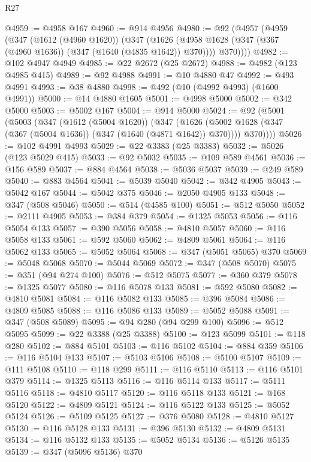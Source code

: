 \begin{lexlean}{R27}
\begin{coremodule}
@4959 := @4958 @167
@4960 := @914 @4956
@4980 := @92
    (@4957
      (@4959
        (@347
          (@1612 (@4960 @1620))
          (@347
            (@1626 (@4958 @1628 (@347 (@367 (@4960 @1636)) (@347 (@1640 (@4835 @1642)) @370))))
            @370))))
@4982 := @102 @4947 @4949
@4985 := @22 @2672 (@25 @2672)
@4988 := @4982 (@123 @4985 @415)
@4989 := @92 @4988
@4991 := @10 @4880 @47
@4992 := @493 @4991
@4993 := @38 @4880
@4998 := @492 (@10 (@4992 @4993) (@1600 @4991))
@5000 := @14 @4880 @1605
@5001 := @4998 @5000
@5002 := @342 @5000
@5003 := @5002 @167
@5004 := @914 @5000
@5024 := @92
    (@5001
      (@5003
        (@347
          (@1612 (@5004 @1620))
          (@347
            (@1626 (@5002 @1628 (@347 (@367 (@5004 @1636)) (@347 (@1640 (@4871 @1642)) @370))))
            @370))))
@5026 := @102 @4991 @4993
@5029 := @22 @3383 (@25 @3383)
@5032 := @5026 (@123 @5029 @415)
@5033 := @92 @5032
@5035 := @109 @589 @4561
@5036 := @156 @589
@5037 := @884 @4564
@5038 := @5036 @5037
@5039 := @249 @589
@5040 := @883 @4564
@5041 := @5039 @5040
@5042 := @342 @4905
@5043 := @5042 @167
@5044 := @5042 @375
@5046 := @2050 @4905 @133
@5048 := @347 (@508 @5046)
@5050 := @514 (@4585 @100)
@5051 := @512 @5050
@5052 := @2111 @4905
@5053 := @384 @379
@5054 := @1325 @5053
@5056 := @116 @5054 @133
@5057 := @390 @5056
@5058 := @4810 @5057
@5060 := @116 @5058 @133
@5061 := @592 @5060
@5062 := @4809 @5061
@5064 := @116 @5062 @133
@5065 := @5052 @5064
@5068 := @347 (@5051 @5065) @370
@5069 := @5048 @5068
@5070 := @5044 @5069
@5072 := @347 (@508 @5070)
@5075 := @351 (@94 @274 @100)
@5076 := @512 @5075
@5077 := @360 @379
@5078 := @1325 @5077
@5080 := @116 @5078 @133
@5081 := @592 @5080
@5082 := @4810 @5081
@5084 := @116 @5082 @133
@5085 := @396 @5084
@5086 := @4809 @5085
@5088 := @116 @5086 @133
@5089 := @5052 @5088
@5091 := @347 (@508 @5089)
@5095 := @94 @280 (@94 @299 @100)
@5096 := @512 @5095
@5099 := @22 @3388 (@25 @3388)
@5100 := @123 @5099
@5101 := @118 @280
@5102 := @884 @5101
@5103 := @116 @5102
@5104 := @884 @359
@5106 := @116 @5104 @133
@5107 := @5103 @5106
@5108 := @5100 @5107
@5109 := @111 @5108
@5110 := @118 @299
@5111 := @116 @5110
@5113 := @116 @5101 @379
@5114 := @1325 @5113
@5116 := @116 @5114 @133
@5117 := @5111 @5116
@5118 := @4810 @5117
@5120 := @116 @5118 @133
@5121 := @168 @5120
@5122 := @4809 @5121
@5124 := @116 @5122 @133
@5125 := @5052 @5124
@5126 := @5109 @5125
@5127 := @376 @5080
@5128 := @4810 @5127
@5130 := @116 @5128 @133
@5131 := @396 @5130
@5132 := @4809 @5131
@5134 := @116 @5132 @133
@5135 := @5052 @5134
@5136 := @5126 @5135
@5139 := @347 (@5096 @5136) @370

\end{coremodule}
\end{lexlean}
